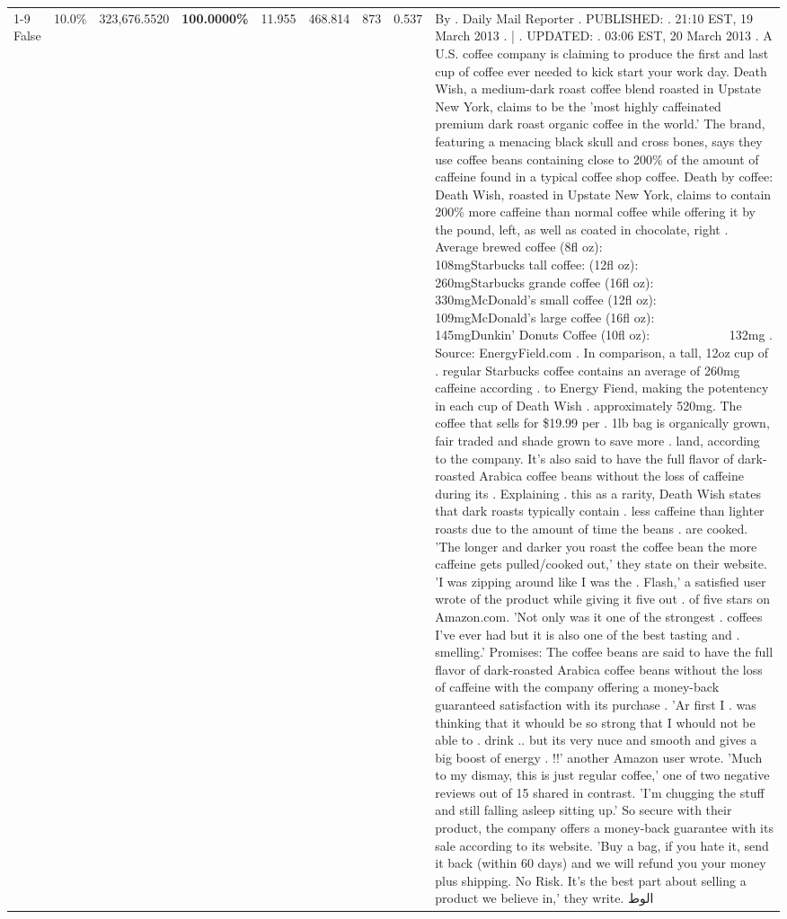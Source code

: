 \begin{table}[H]
{\begin{tabular}{lllrlllll}
\cline{1-9}
False & 10.0\% & 323,676.5520 & \bfseries \color{red} 100.0000\% & 11.955 & 468.814 & 873 & 0.537 & By . Daily Mail Reporter . PUBLISHED: . 21:10 EST, 19 March 2013 . | . UPDATED: . 03:06 EST, 20 March 2013 . A U.S. coffee company is claiming to produce the first and last cup of coffee ever needed to kick start your work day. Death Wish, a medium-dark roast coffee blend roasted in Upstate New York, claims to be the 'most highly caffeinated premium dark roast organic coffee in the world.' The brand, featuring a menacing black skull and cross bones, says they use coffee beans containing close to 200\% of the amount of caffeine found in a typical coffee shop coffee. Death by coffee: Death Wish, roasted in Upstate New York, claims to contain 200\% more caffeine than normal coffee while offering it by the pound, left, as well as coated in chocolate, right . Average brewed coffee (8fl oz):              108mgStarbucks tall coffee: (12fl oz):                260mgStarbucks grande coffee (16fl oz):         330mgMcDonald's small coffee (12fl oz):           109mgMcDonald's large coffee (16fl oz):           145mgDunkin' Donuts Coffee (10fl oz):             132mg . Source: EnergyField.com . In comparison, a tall, 12oz cup of . regular Starbucks coffee contains an average of 260mg caffeine according . to Energy Fiend, making the potentency in each cup of Death Wish . approximately 520mg. The coffee that sells for \$19.99 per . 1lb bag is organically grown, fair traded and shade grown to save more . land, according to the company. It's also said to have the full flavor of dark-roasted Arabica coffee beans without the loss of caffeine during its . Explaining . this as a rarity, Death Wish states that dark roasts typically contain . less caffeine than lighter roasts due to the amount of time the beans . are cooked. 'The longer and darker you roast the coffee bean the more caffeine gets pulled/cooked out,' they state on their website. 'I was zipping around like I was the . Flash,' a satisfied user wrote of the product while giving it five out . of five stars on Amazon.com. 'Not only was it one of the strongest . coffees I've ever had but it is also one of the best tasting and . smelling.’ Promises: The coffee beans are said to have the full flavor of dark-roasted Arabica coffee beans without the loss of caffeine with the company offering a money-back guaranteed satisfaction with its purchase . 'Ar first I . was thinking that it whould be so strong that I whould not be able to . drink .. but its very nuce and smooth and gives a big boost of energy . !!' another Amazon user wrote. 'Much to my dismay, this is just regular coffee,' one of two negative reviews out of 15 shared in contrast. 'I'm chugging the stuff and still falling asleep sitting up.' So secure with their product, the company offers a money-back guarantee with its sale according to its website. 'Buy a bag, if you hate it, send it back (within 60 days) and we will refund you your money plus shipping. No Risk. It’s the best part about selling a product we believe in,' they write. الوط \\

\end{tabular}}
\end{table}
